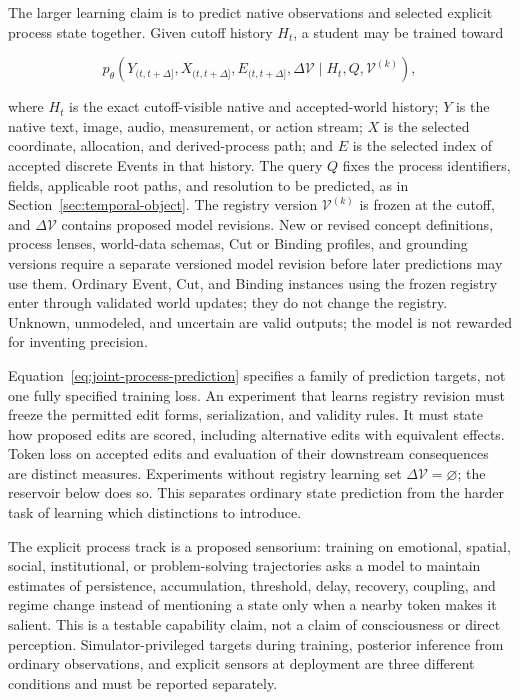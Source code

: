 \documentclass[10pt]{article}
\begin{document}
The larger learning claim is to predict native observations and selected
explicit process state together. Given cutoff history $H_t$, a student may be
trained toward

\begin{equation}
 p_{\theta}\!\left(
   Y_{(t,t+\Delta]},X_{(t,t+\Delta]},E_{(t,t+\Delta]},\Delta\mathcal V
   \mid H_t,Q,\mathcal V^{(k)}
 \right),
 \label{eq:joint-process-prediction}
\end{equation}

where $H_t$ is the exact cutoff-visible native and accepted-world history;
$Y$ is the native text, image, audio, measurement, or action stream; $X$ is the
selected coordinate, allocation, and derived-process path; and $E$ is the
selected index of accepted discrete Events in that history. The query $Q$ fixes the process
identifiers, fields, applicable root paths, and resolution to be predicted, as in
Section~\ref{sec:temporal-object}. The registry version $\mathcal V^{(k)}$ is
frozen at the cutoff, and $\Delta\mathcal V$ contains proposed model revisions.
New or revised concept definitions, process lenses, world-data schemas, Cut or
Binding profiles, and grounding versions require a separate versioned model
revision before later predictions may use them. Ordinary Event, Cut, and Binding
instances using the frozen registry enter through validated world updates;
they do not change the registry. Unknown, unmodeled, and uncertain are valid
outputs; the model is not rewarded for inventing precision.

Equation~\ref{eq:joint-process-prediction} specifies a family of prediction
targets, not one fully specified training loss. An experiment that learns
registry revision must freeze the permitted edit forms, serialization, and
validity rules. It must state how proposed edits are scored, including
alternative edits with equivalent effects. Token loss on accepted edits and
evaluation of their downstream consequences are distinct measures. Experiments
without registry learning set $\Delta\mathcal V=\varnothing$; the reservoir
below does so. This separates ordinary state prediction from the harder task
of learning which distinctions to introduce.

The explicit process track is a proposed sensorium: training on emotional,
spatial, social, institutional, or problem-solving trajectories asks a model to
maintain estimates of persistence, accumulation, threshold, delay, recovery,
coupling, and regime change instead of mentioning a state only when a nearby
token makes it salient. This is a testable capability claim, not a claim of
consciousness or direct perception. Simulator-privileged targets during
training, posterior inference from ordinary observations, and explicit sensors
at deployment are three different conditions and must be reported separately.
\end{document}

